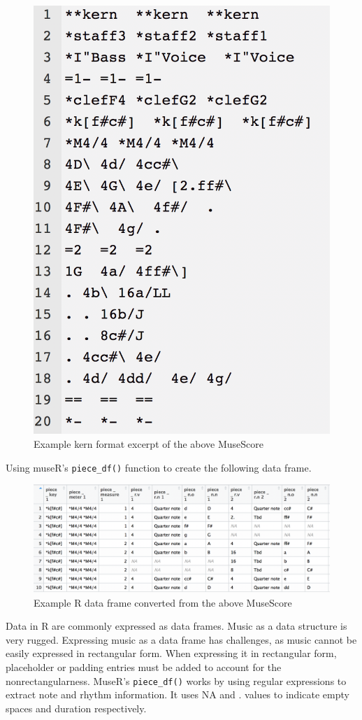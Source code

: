 \documentclass[12pt,twoside]{reedthesis}
\theoremstyle{definition}
\theoremstyle{definition}
\theoremstyle{definition}
\theoremstyle{remark}
\begin{document}
\begin{figure}[h]
\centering
\includegraphics[scale = .5]{images/ex1k.png}
\caption{Example kern format excerpt of the above MuseScore}
\label{subd}
\end{figure}
Using museR's \texttt{piece\_df()} function to create the following data
frame.
\begin{figure}[h]
\centering
\includegraphics[scale = .5]{images/ex1r.png}
\caption{Example R data frame converted from the above MuseScore}
\label{subd}
\end{figure}
Data in R are commonly expressed as data frames. Music as a data
structure is very rugged. Expressing music as a data frame has
challenges, as music cannot be easily expressed in rectangular form.
When expressing it in rectangular form, placeholder or padding entries
must be added to account for the nonrectangularness. MuseR's
\texttt{piece\_df()} works by using regular expressions to extract note
and rhythm information. It uses NA and . values to indicate empty spaces
and duration respectively.
\end{document}
